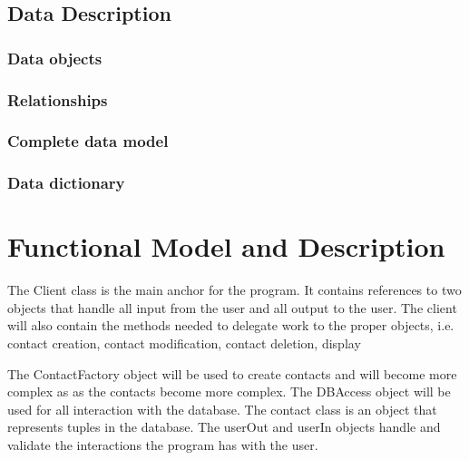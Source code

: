 \documentclass{article}
\begin{document}
\subsection{Data Description}

\subsubsection{Data objects}

\subsubsection{Relationships}

\subsubsection{Complete data model}

\subsubsection{Data dictionary}

\section{Functional Model and Description}
The Client class is the main anchor for the program. 
It contains references to two objects that handle all input from the user and all output to the user. 
The client will also contain the methods needed to delegate work to the proper objects, i.e. contact creation, contact modification, contact deletion, display

The ContactFactory object will be used to create contacts and will become more complex as as the contacts become more complex.
The DBAccess object will be used for all interaction with the database.
The contact class is an object that represents tuples in the database.
The userOut and userIn objects handle and validate the interactions the program has with the user.
\end{document}

